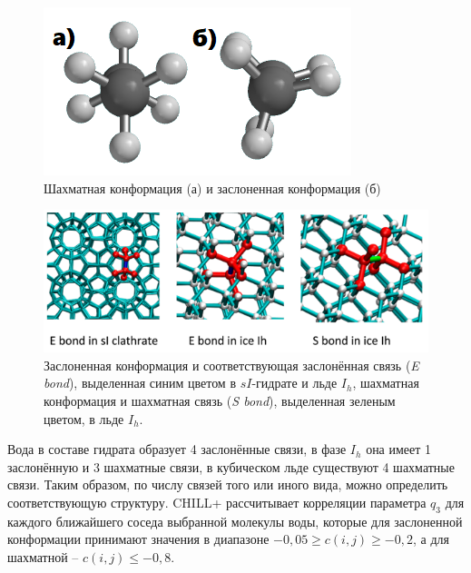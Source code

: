 \begin{figure}[H]
    \centering
    \includegraphics{figures/bonds.png}
    \caption{Шахматная конформация (а) и заслоненная конформация (б)}
    \label{fig2.11}
\end{figure}
\begin{figure}[H]
    \centering
    \includegraphics{figures/chillplus.png}
    \caption{Заслоненная конформация и соответствующая заслонённая связь (\textit{E bond}), выделенная синим цветом в $sI$-гидрате и льде $I_h$, шахматная конформация и шахматная связь (\textit{S bond}), выделенная зеленым цветом, в льде $I_h$.}
    \label{fig2.12}
\end{figure}

Вода в составе гидрата образует 4 заслонённые связи, в фазе $I_h$ она имеет 1 заслонённую и 3 шахматные связи, в кубическом льде существуют 4 шахматные связи. Таким образом, по числу связей того или иного вида, можно определить соответствующую структуру. CHILL+ рассчитывает корреляции параметра $q_3$ для каждого ближайшего соседа выбранной молекулы воды, которые для заслоненной конформации принимают значения в диапазоне $-0,05\geq c(i,j) \geq -0,2$, а для шахматной -- $c(i,j)\leq -0,8$.